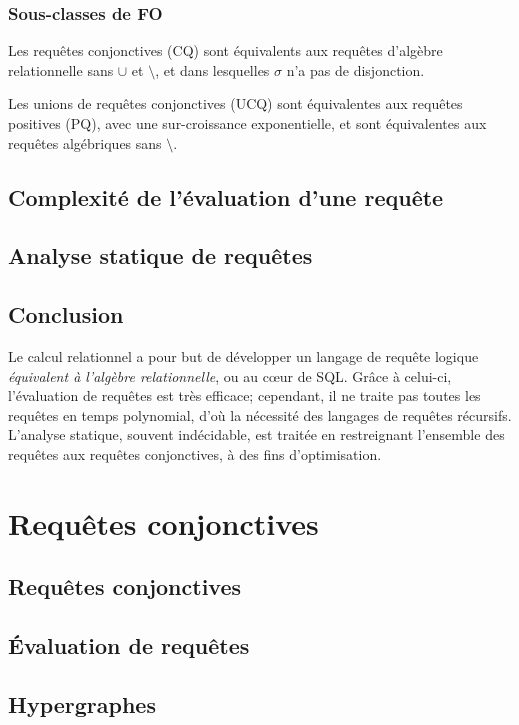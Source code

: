 \documentclass[french, toc]{../cs-classes/cs-classes}
\begin{document}
\subsubsection{Sous-classes de FO}
Les requêtes conjonctives (CQ) sont équivalents aux requêtes d'algèbre relationnelle sans $\cup$ et $\setminus$, et dans lesquelles $\sigma$ n'a pas de disjonction.

Les unions de requêtes conjonctives (UCQ) sont équivalentes aux requêtes positives (PQ), avec une sur-croissance exponentielle, et sont équivalentes aux requêtes algébriques sans $\setminus$.

\subsection{Complexité de l'évaluation d'une requête}

\subsection{Analyse statique de requêtes}

\subsection*{Conclusion}
Le calcul relationnel a pour but de développer un langage de requête logique \emph{équivalent à l'algèbre relationnelle}, ou au cœur de SQL.
Grâce à celui-ci, l'évaluation de requêtes est très efficace; cependant, il ne traite pas toutes les requêtes en temps polynomial, d'où la nécessité des langages de requêtes récursifs. L'analyse statique, souvent indécidable, est traitée en restreignant l'ensemble des requêtes aux requêtes conjonctives, à des fins d'optimisation.

\section{Requêtes conjonctives}
\subsection{Requêtes conjonctives}

\subsection{Évaluation de requêtes}

\subsection{Hypergraphes}
\end{document}
